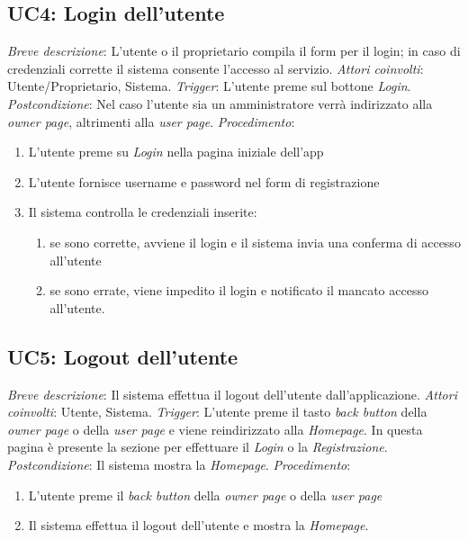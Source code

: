 \clearpage
\subsection{UC4: Login dell'utente}
 \emph{Breve descrizione}: L'utente o il proprietario compila il form per il login; in caso di credenziali corrette il sistema consente l'accesso al servizio.\medbreak
 \emph{Attori coinvolti}: Utente/Proprietario, Sistema.\medbreak
 \emph{Trigger}: L'utente preme sul bottone \textit{Login}. \medbreak
 \emph{Postcondizione}: Nel caso l'utente sia un amministratore verrà indirizzato alla \textit{owner page}, altrimenti alla \textit{user page}. \medbreak
 \emph{Procedimento}:
\begin{enumerate}
    \item L'utente preme su \textit{Login} nella pagina iniziale dell'app
    \item L'utente fornisce username e password nel form di registrazione
    \item Il sistema controlla le credenziali inserite:
          \begin{enumerate}
              \item se sono corrette, avviene il login e il sistema invia una conferma di accesso all'utente
              \item se sono errate, viene impedito il login e notificato il mancato accesso all'utente.
          \end{enumerate}
\end{enumerate}

\subsection{UC5: Logout dell'utente}
 \emph{Breve descrizione}: Il sistema effettua il logout dell'utente dall'applicazione.\medbreak
 \emph{Attori coinvolti}: Utente, Sistema.\medbreak
 \emph{Trigger}: L'utente preme il tasto \textit{back button} della \textit{owner page} o della \textit{user page} e viene reindirizzato alla \textit{Homepage}. In questa pagina è presente la sezione per effettuare il \textit{Login} o la \textit{Registrazione}.  \medbreak
 \emph{Postcondizione}: Il sistema mostra la \textit{Homepage}. \medbreak
 \emph{Procedimento}:
\begin{enumerate}
    \item L'utente preme il \textit{back button} della \textit{owner page} o  della \textit{user page}
    \item Il sistema effettua il logout dell'utente e mostra la \textit{Homepage}. 
\end{enumerate}

